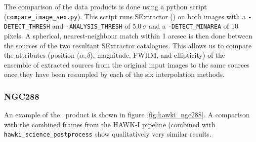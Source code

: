 The comparison of the data products is done using a python script ({\tt compare\_image\_sex.py}).  This script runs SExtractor (\cite{bertin})
on both images with a {\tt -DETECT\_THRESH} and {\tt -ANALYSIS\_THRESH} of 5.0\,$\sigma$ and a {\tt -DETECT\_MINAREA} of 10 pixels.
A spherical, nearest-neighbour match within 1 arcsec is then done between the sources of the two resultant SExtractor catalogues.
This allows us to compare the attributes (position ($\alpha, \delta$), magnitude, FWHM, and ellipticity) of the ensemble of extracted sources
from the original input images to the same sources once they have been resampled by each of the six interpolation methods.


\subsubsection{NGC288}

An example of the \hdrlresample\ product is shown in figure \ref{fig:hawki_ngc288}.  A comparison with the combined frames from the
HAWK-I pipeline (combined with {\tt hawki\_science\_postprocess} show qualitatively very similar results.


